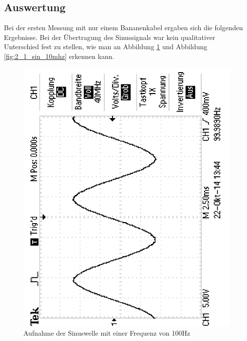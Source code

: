 \documentclass[12pt,a4paper]{article}
\begin{document}
\subsection{Auswertung}
Bei der ersten Messung mit nur einem Bananenkabel ergaben sich die folgenden Ergebnisse.
Bei der Übertragung des Sinussignals war kein qualitativer Unterschied fest zu stellen, wie man an Abbildung \ref{fig:2_1_sin_100hz} und Abbildung \ref{fig:2_1_sin_10mhz} erkennen kann.

\begin{figure}[H] 
  \centering
    \includegraphics[scale = 0.4, angle = -90]{2_1_sin_100hz.pdf}
  	\caption[Aufnahme der Sinuswelle mit einer Frequenz von 100Hz]{Aufnahme der Sinuswelle mit einer Frequenz von 100Hz}
  \label{fig:2_1_sin_100hz}
\end{figure}
\end{document}
